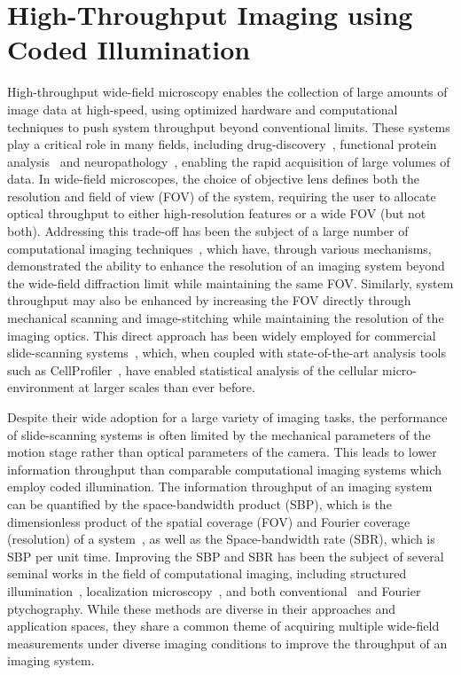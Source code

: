 \chapter{High-Throughput Imaging using Coded Illumination}\label{ch:highthroughput}

High-throughput wide-field microscopy enables the collection of large amounts of image data at high-speed, using optimized hardware and computational techniques to push system throughput beyond conventional limits. These systems play a critical role in many fields, including drug-discovery~\cite{Perlman1194, brodin2011high, bickle2010beautiful}, functional protein analysis~\cite{Liebel:03, huh2003global} and  neuropathology~\cite{peiffer1979alcohol, remmelinck2000could, alegro2017automating}, enabling the rapid acquisition of large volumes of data. In wide-field microscopes, the choice of objective lens defines both the resolution and field of view (FOV) of the system, requiring the user to allocate optical throughput to either high-resolution features or a wide FOV (but not both). Addressing this trade-off has been the subject of a large number of computational imaging techniques~\cite{Zheng2013, betzig2006imaging, Rust:06, gustafsson2000surpassing, rodenburg2004phase, Tian2014}, which have, through various mechanisms, demonstrated the ability to enhance the resolution of an imaging system beyond the wide-field diffraction limit while maintaining the same FOV. Similarly, system throughput may also be enhanced by increasing the FOV directly through mechanical scanning and image-stitching while maintaining the resolution of the imaging optics. This direct approach has been widely employed for commercial slide-scanning systems~\cite{zeissSlideScan}, which, when coupled with state-of-the-art analysis tools such as CellProfiler~\cite{Carpenter2006}, have enabled statistical analysis of the cellular micro-environment at larger scales than ever before.

Despite their wide adoption for a large variety of imaging tasks, the performance of slide-scanning systems is often limited by the mechanical parameters of the motion stage rather than optical parameters of the camera. This leads to lower information throughput than comparable computational imaging systems which employ coded illumination. The information throughput of an imaging system can be quantified by the space-bandwidth product (SBP), which is the dimensionless product of the spatial coverage (FOV) and Fourier coverage (resolution) of a system~\cite{Lohmann1996space}, as well as the Space-bandwidth rate (SBR), which is SBP per unit time. Improving the SBP and SBR has been the subject of several seminal works in the field of computational imaging, including structured illumination~\cite{gustafsson2000surpassing}, localization microscopy~\cite{Rust:06, betzig2006imaging}, and both conventional~\cite{rodenburg2004phase} and Fourier~\cite{Zheng2013,tian2015computational,Tian2014} ptychography. While these methods are diverse in their approaches and application spaces, they share a common theme of acquiring multiple wide-field measurements under diverse imaging conditions to improve the throughput of an imaging system.

